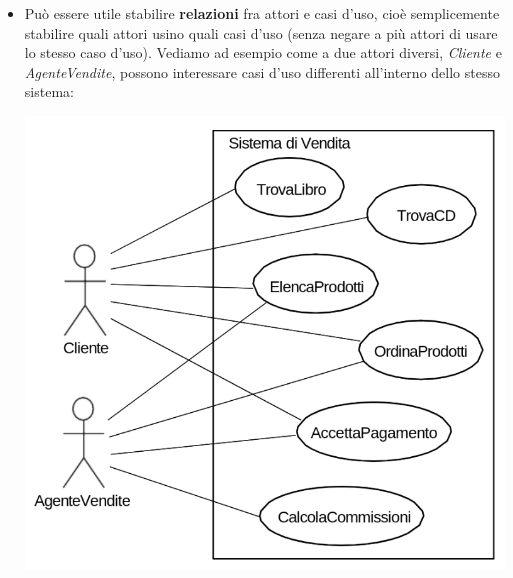 \documentclass[a4paper,11pt]{article}
\begin{document}
\begin{itemize}
	\item Può essere utile stabilire \textbf{relazioni} fra attori e casi d'uso, cioè semplicemente stabilire quali attori usino quali casi d'uso (senza negare a più attori di usare lo stesso caso d'uso).
		Vediamo ad esempio come a due attori diversi, \textit{Cliente} e \textit{AgenteVendite}, possono interessare casi d'uso differenti all'interno dello stesso sistema: 
\begin{center}
	\includegraphics[scale=0.35]{../figures/assoc_attori_casi_uso.png}
\end{center}


\end{itemize}
\end{document}
